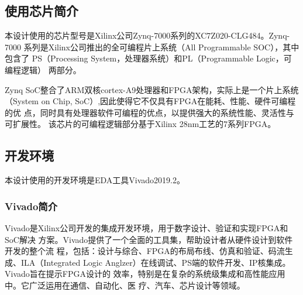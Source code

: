 \documentclass{article}
\numberwithin {equation}{section}
\begin{document}
\begin{spacing}{1.25}
  \subsection{使用芯片简介}
    \vspace{1em}
    本设计使用的芯片型号是Xilinx公司Zynq-7000系列的XC7Z020-CLG484。Zynq-7000
    系列是Xilinx公司推出的全可编程片上系统（All Programmable SOC），其中包含了
    PS（Processing System，处理器系统）和PL（Programmable Logic，可编程逻辑）
    两部分。

    Zynq SoC整合了ARM双核cortex-A9处理器和FPGA架构，实际上是一个片上系统
    （System on Chip, SoC）,因此使得它不仅具有FPGA在能耗、性能、硬件可编程的优
    点，同时具有处理器软件可编程的优点，以提供强大的系统性能、灵活性与可扩展性。
    该芯片的可编程逻辑部分基于Xilinx 28nm工艺的7系列FPGA。
  \subsection{开发环境}
    本设计使用的开发环境是EDA工具Vivado2019.2。
    \subsubsection{Vivado简介}
    \vspace{1em}
      Vivado是Xilinx公司开发的集成开发环境，用于数字设计、验证和实现FPGA和SoC解决
      方案。Vivado提供了一个全面的工具集，帮助设计者从硬件设计到软件开发的整个流
      程，包括：设计与综合、FPGA的布局布线、仿真和验证、码流生成、ILA（Integrated
       Logic Anglzer）在线调试、PS端的软件开发、IP核集成。Vivado旨在提示FPGA设计的
       效率，特别是在复杂的系统级集成和高性能应用中。它广泛运用在通信、自动化、医
       疗、汽车、芯片设计等领域。

\newpage

\end{spacing}
\end{document}
